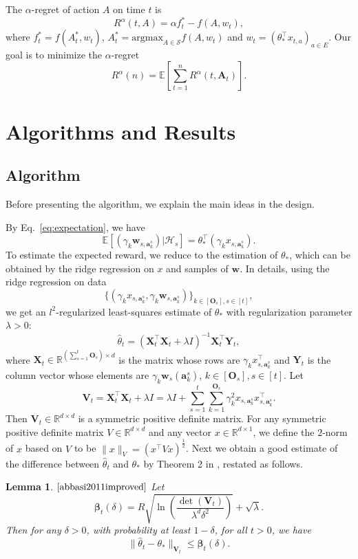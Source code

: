 \documentclass{article}
\newcommand{\bbeta}{\boldsymbol{\beta}}
\newcommand{\EE}{\mathbb{E}}
\newcommand{\RR}{\mathbb{R}}
\newcommand{\bA}{\mathbf{A}}
\newcommand{\ba}{\mathbf{a}}
\newcommand{\bO}{\mathbf{O}}
\newcommand{\bV}{\mathbf{V}}
\newcommand{\bw}{\mathbf{w}}
\newcommand{\bX}{\mathbf{X}}
\newcommand{\bY}{\mathbf{Y}}
\newcommand{\cH}{\mathcal{H}}
\newcommand{\cS}{\mathcal{S}}
\newcommand{\argmax}{\mathrm{argmax}}
\newcommand{\norm}[1]{\| #1 \|}
\newtheorem{lemma}[theorem]{Lemma}%
\begin{document}
The $\alpha$-regret of action $A$ on time $t$ is
$$
R^{\alpha}(t, A) = \alpha f_t^{\ast} - f(A, w_t),
$$
where $f_t^{\ast} = f(A_t^*, w_t)$, $A_t^* = \argmax_{A\in\cS} f(A, w_t)$ and $w_t = (\theta_{\ast}^{\top}x_{t,a})_{a \in E}$. Our goal is to minimize the $\alpha$-regret
$$
R^{\alpha}(n) = \EE[ \sum_{t=1}^n R^{\alpha}(t, \bA_t)].
$$
	
\section{Algorithms and Results}

\subsection{Algorithm}

Before presenting the algorithm, we explain the main ideas in the design.

By Eq.~\eqref{eq:expectation}, we have 
$$
  \EE[(\gamma_k \bw_{s,\ba_k^s}) | \cH_{s}] = \theta_*^{\top} (\gamma_k x_{s,\ba_k^s}).
$$
To estimate the expected reward, we reduce to the estimation of $\theta_{\ast}$, which can be obtained by the ridge regression on $x$ and samples of $\bw$. In details, using the ridge regression on data 
$$
  \{(\gamma_k x_{s,\ba_k^s}, \gamma_k \bw_{s,\ba_k^s})\}_{k \in[\bO_s], s\in[t]},
$$
we get an $l^2$-regularized least-squares estimate of $\theta_*$ with regularization parameter $\lambda > 0$:
\begin{equation}
  \hat{\theta}_t = (\bX_t^{\top}\bX_t + \lambda I)^{-1} \bX_t^{\top} \bY_t,
\end{equation}
where $\bX_t \in \RR^{(\sum_{s=1}^{t}\bO_s) \times d}$ is the matrix whose rows are $\gamma_k x_{s,\ba_k^s}^{\top}$ and $\bY_t$ is the column vector whose elements are $\gamma_k \bw_s(\ba_k^s)$, $k \in[\bO_s], s\in[t]$. Let
$$
  \bV_t = \bX_t^{\top} \bX_t + \lambda I = \lambda I + \sum_{s=1}^{t} \sum_{k=1}^{\bO_s} \gamma_k^2 x_{s,\ba_k^s}x_{s,\ba_k^s}^{\top}.
$$
Then $\bV_t \in \RR^{d \times d}$ is a symmetric positive definite matrix. For any symmetric positive definite matrix $V \in \RR^{d \times d} $ and any vector $x \in \RR^{d \times 1}$, we define the $2$-norm of $x$ based on $V$ to be $\norm{x}_V = (x^{\top} V x)^{\frac{1}{2}}$. Next we obtain a good estimate of the difference between $\hat{\theta}_t$ and $\theta_*$ by Theorem 2 in \cite{abbasi2011improved}, restated as follows.

\begin{lemma} $\mathrm{\cite{abbasi2011improved}}$ %
  \label{thm:theta_estimate}
  Let 
  \begin{equation}
    \bbeta_{t}(\delta) = R\sqrt{\ln\left(\frac{\det(\bV_{t})}{\lambda^d \delta^2}\right)} + \sqrt{\lambda}. \label{eq:definebeta}
  \end{equation}
  Then for any $\delta > 0$, with probability at least $1 - \delta$, for all $t > 0$, we have
  \begin{equation}
    \label{eq:estimateTheta}
    \norm{\hat{\theta}_t - \theta_{\ast}}_{\bV_{t}} \leq \bbeta_{t}(\delta).
  \end{equation}
\end{lemma}
\end{document}
